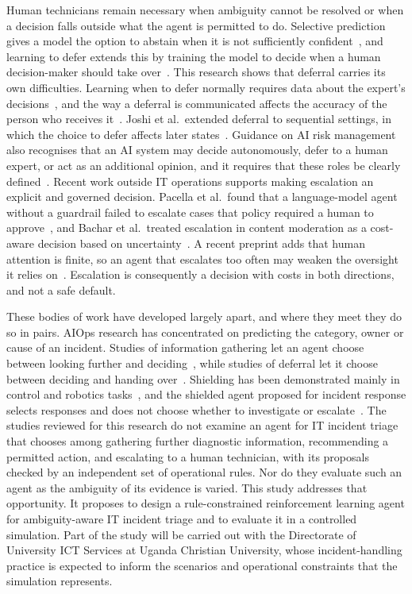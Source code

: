 \documentclass[12pt,a4paper]{article}
\begin{document}
Human technicians remain necessary when ambiguity cannot be resolved or when a decision falls outside what the agent is permitted to do. Selective prediction gives a model the option to abstain when it is not sufficiently confident~\cite{geifman2019}, and learning to defer extends this by training the model to decide when a human decision-maker should take over~\cite{madras2018}. This research shows that deferral carries its own difficulties. Learning when to defer normally requires data about the expert's decisions~\cite{hemmer2023}, and the way a deferral is communicated affects the accuracy of the person who receives it~\cite{bondi2022}. Joshi et al.\ extended deferral to sequential settings, in which the choice to defer affects later states~\cite{joshi2023}. Guidance on AI risk management also recognises that an AI system may decide autonomously, defer to a human expert, or act as an additional opinion, and it requires that these roles be clearly defined~\cite{nist2023}. Recent work outside IT operations supports making escalation an explicit and governed decision. Pacella et al.\ found that a language-model agent without a guardrail failed to escalate cases that policy required a human to approve~\cite{pacella2026}, and Bachar et al.\ treated escalation in content moderation as a cost-aware decision based on uncertainty~\cite{bachar2026}. A recent preprint adds that human attention is finite, so an agent that escalates too often may weaken the oversight it relies on~\cite{turan2026}. Escalation is consequently a decision with costs in both directions, and not a safe default.

These bodies of work have developed largely apart, and where they meet they do so in pairs. AIOps research has concentrated on predicting the category, owner or cause of an incident. Studies of information gathering let an agent choose between looking further and deciding~\cite{janisch2019,kim2025}, while studies of deferral let it choose between deciding and handing over~\cite{madras2018,joshi2023}. Shielding has been demonstrated mainly in control and robotics tasks~\cite{alshiekh2018,achiam2017,zhao2023}, and the shielded agent proposed for incident response selects responses and does not choose whether to investigate or escalate~\cite{alauthman2026}. The studies reviewed for this research do not examine an agent for IT incident triage that chooses among gathering further diagnostic information, recommending a permitted action, and escalating to a human technician, with its proposals checked by an independent set of operational rules. Nor do they evaluate such an agent as the ambiguity of its evidence is varied. This study addresses that opportunity. It proposes to design a rule-constrained reinforcement learning agent for ambiguity-aware IT incident triage and to evaluate it in a controlled simulation. Part of the study will be carried out with the Directorate of University ICT Services at Uganda Christian University, whose incident-handling practice is expected to inform the scenarios and operational constraints that the simulation represents.
\end{document}
